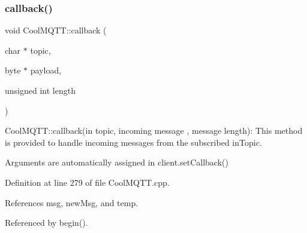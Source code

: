 \subsubsection{\texorpdfstring{callback()}{callback()}}
{\footnotesize\ttfamily void Cool\+M\+Q\+T\+T\+::callback (\begin{DoxyParamCaption}\item[{char $\ast$}]{topic,  }\item[{byte $\ast$}]{payload,  }\item[{unsigned int}]{length }\end{DoxyParamCaption})}

Cool\+M\+Q\+T\+T\+::callback(in topic, incoming message , message length)\+: This method is provided to handle incoming messages from the subscribed in\+Topic.

Arguments are automatically assigned in client.\+set\+Callback() 

Definition at line 279 of file Cool\+M\+Q\+T\+T.\+cpp.



References msg, new\+Msg, and temp.



Referenced by begin().


